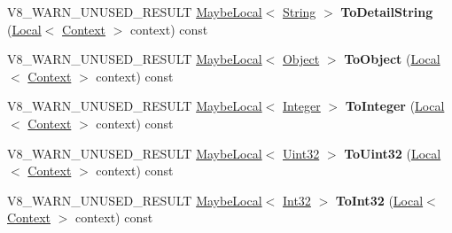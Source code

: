 \begin{DoxyCompactItemize}
\item 
\mbox{\label{classv8_1_1Value_ac68848409bb1316e12d40753b10d8f95}} 
V8\+\_\+\+W\+A\+R\+N\+\_\+\+U\+N\+U\+S\+E\+D\+\_\+\+R\+E\+S\+U\+LT \mbox{\hyperlink{classv8_1_1MaybeLocal}{Maybe\+Local}}$<$ \mbox{\hyperlink{classv8_1_1String}{String}} $>$ {\bfseries To\+Detail\+String} (\mbox{\hyperlink{classv8_1_1Local}{Local}}$<$ \mbox{\hyperlink{classv8_1_1Context}{Context}} $>$ context) const
\item 
\mbox{\label{classv8_1_1Value_ab062e631c9d2757d655730a154d370c1}} 
V8\+\_\+\+W\+A\+R\+N\+\_\+\+U\+N\+U\+S\+E\+D\+\_\+\+R\+E\+S\+U\+LT \mbox{\hyperlink{classv8_1_1MaybeLocal}{Maybe\+Local}}$<$ \mbox{\hyperlink{classv8_1_1Object}{Object}} $>$ {\bfseries To\+Object} (\mbox{\hyperlink{classv8_1_1Local}{Local}}$<$ \mbox{\hyperlink{classv8_1_1Context}{Context}} $>$ context) const
\item 
\mbox{\label{classv8_1_1Value_acd519ca3b1a165514bbb5cfba4d44ff7}} 
V8\+\_\+\+W\+A\+R\+N\+\_\+\+U\+N\+U\+S\+E\+D\+\_\+\+R\+E\+S\+U\+LT \mbox{\hyperlink{classv8_1_1MaybeLocal}{Maybe\+Local}}$<$ \mbox{\hyperlink{classv8_1_1Integer}{Integer}} $>$ {\bfseries To\+Integer} (\mbox{\hyperlink{classv8_1_1Local}{Local}}$<$ \mbox{\hyperlink{classv8_1_1Context}{Context}} $>$ context) const
\item 
\mbox{\label{classv8_1_1Value_a57bf05495a18e7acffa3542334773c4b}} 
V8\+\_\+\+W\+A\+R\+N\+\_\+\+U\+N\+U\+S\+E\+D\+\_\+\+R\+E\+S\+U\+LT \mbox{\hyperlink{classv8_1_1MaybeLocal}{Maybe\+Local}}$<$ \mbox{\hyperlink{classv8_1_1Uint32}{Uint32}} $>$ {\bfseries To\+Uint32} (\mbox{\hyperlink{classv8_1_1Local}{Local}}$<$ \mbox{\hyperlink{classv8_1_1Context}{Context}} $>$ context) const
\item 
\mbox{\label{classv8_1_1Value_a4d12475faee2804805517ae45bc16922}} 
V8\+\_\+\+W\+A\+R\+N\+\_\+\+U\+N\+U\+S\+E\+D\+\_\+\+R\+E\+S\+U\+LT \mbox{\hyperlink{classv8_1_1MaybeLocal}{Maybe\+Local}}$<$ \mbox{\hyperlink{classv8_1_1Int32}{Int32}} $>$ {\bfseries To\+Int32} (\mbox{\hyperlink{classv8_1_1Local}{Local}}$<$ \mbox{\hyperlink{classv8_1_1Context}{Context}} $>$ context) const
\item 
\mbox{\label{classv8_1_1Value_ad3b9978f3fedccb48817ce87c5a454ed}} 

\end{DoxyCompactItemize}
